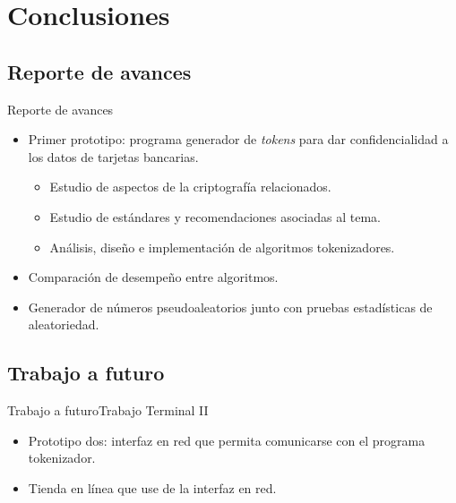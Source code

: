 %
%

\section{Conclusiones}

\subsection{Reporte de avances} %
\begin{frame}{Reporte de avances}

  \begin{itemize}
    \item<2-> Primer prototipo: programa generador de \textit{tokens} para
      dar confidencialidad a los datos de tarjetas bancarias.
      \begin{itemize}
        \item<3-> Estudio de aspectos de la criptografía relacionados.
        \item<4-> Estudio de estándares y recomendaciones asociadas al tema.
        \item<5-> Análisis, diseño e implementación de algoritmos tokenizadores.
      \end{itemize}
    \item<6-> Comparación de desempeño entre algoritmos.
    \item<7-> Generador de números pseudoaleatorios junto con pruebas
      estadísticas de aleatoriedad.
  \end{itemize}

\end{frame}

\subsection{Trabajo a futuro} %
\begin{frame}{Trabajo a futuro}{Trabajo Terminal II}

  \begin{itemize}
    \item<2-> Prototipo dos: interfaz en red que permita comunicarse con el programa
      tokenizador.
    \item<3-> Tienda en línea que use de la interfaz en red.
  \end{itemize}

\end{frame}
